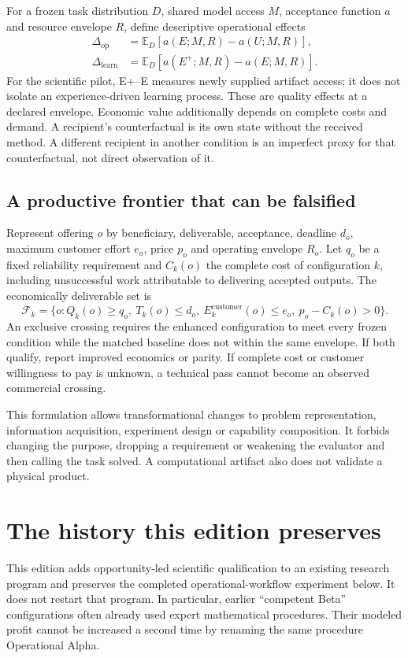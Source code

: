 \documentclass[11pt,letterpaper]{article}
\begin{document}
For a frozen task distribution $D$, shared model access $M$, acceptance function $a$ and resource envelope $R$, define descriptive operational effects
\begin{align}
\Delta_{\mathrm{op}} &= \mathbb{E}_{D}[a(E;M,R)-a(U;M,R)],\\
\Delta_{\mathrm{learn}} &= \mathbb{E}_{D}[a(E^{+};M,R)-a(E;M,R)].
\end{align}
For the scientific pilot, E+--E measures newly supplied artifact access; it does not isolate an experience-driven learning process. These are quality effects at a declared envelope. Economic value additionally depends on complete costs and demand. A recipient's counterfactual is its own state without the received method. A different recipient in another condition is an imperfect proxy for that counterfactual, not direct observation of it.

\subsection{A productive frontier that can be falsified}
Represent offering $o$ by beneficiary, deliverable, acceptance, deadline $d_o$, maximum customer effort $e_o$, price $p_o$ and operating envelope $R_o$. Let $q_o$ be a fixed reliability requirement and $C_k(o)$ the complete cost of configuration $k$, including unsuccessful work attributable to delivering accepted outputs. The economically deliverable set is
\[
\mathcal F_k=\{o:Q_k(o)\geq q_o,\ T_k(o)\leq d_o,\ E^{\mathrm{customer}}_k(o)\leq e_o,\ p_o-C_k(o)>0\}.
\]
An exclusive crossing requires the enhanced configuration to meet every frozen condition while the matched baseline does not within the same envelope. If both qualify, report improved economics or parity. If complete cost or customer willingness to pay is unknown, a technical pass cannot become an observed commercial crossing.

This formulation allows transformational changes to problem representation, information acquisition, experiment design or capability composition. It forbids changing the purpose, dropping a requirement or weakening the evaluator and then calling the task solved. A computational artifact also does not validate a physical product.



\section{The history this edition preserves}
This edition adds opportunity-led scientific qualification to an existing research program and preserves the completed operational-workflow experiment below. It does not restart that program. In particular, earlier ``competent Beta'' configurations often already used expert mathematical procedures. Their modeled profit cannot be increased a second time by renaming the same procedure Operational Alpha.
\end{document}
